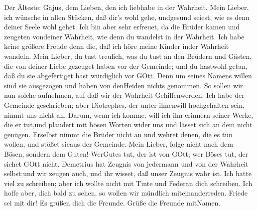  Der Älteste: Gajus, dem Lieben, den ich liebhabe in der
Wahrheit.  Mein Lieber, ich wünsche in allen Stücken, daß
dir's wohl gehe, undgesund seiest, wie es denn deiner Seele wohl gehet.
 Ich bin aber sehr erfreuet, da die Brüder kamen und
zeugeten vondeiner Wahrheit, wie denn du wandelst in der Wahrheit.
 Ich habe keine größere Freude denn die, daß ich höre meine
Kinder inder Wahrheit wandeln.  Mein Lieber, du tust
treulich, was du tust an den Brüdern und Gästen,  die von
deiner Liebe gezeuget haben vor der Gemeinde; und du hastwohl getan, daß
du sie abgefertiget hast würdiglich vor GOtt.  Denn um
seines Namens willen sind sie ausgezogen und haben von denHeiden nichts
genommen.  So sollen wir nun solche aufnehmen, auf daß wir
der Wahrheit Gehilfenwerden.  Ich habe der Gemeinde
geschrieben; aber Diotrephes, der unter ihnenwill hochgehalten sein,
nimmt uns nicht an.  Darum, wenn ich komme, will ich ihn
erinnern seiner Werke, die er tut,und plaudert mit bösen Worten wider
uns und lässet sich an dem nicht genügen. Erselbst nimmt die Brüder
nicht an und wehret denen, die es tun wollen, und stößet sieaus der
Gemeinde.  Mein Lieber, folge nicht nach dem Bösen, sondern
dem Guten! WerGutes tut, der ist von GOtt; wer Böses tut, der siehet
GOtt nicht.  Demetrius hat Zeugnis von jedermann und von
der Wahrheit selbst;und wir zeugen auch, und ihr wisset, daß unser
Zeugnis wahr ist.  Ich hatte viel zu schreiben; aber ich
wollte nicht mit Tinte und Federan dich schreiben.  Ich
hoffe aber, dich bald zu sehen, so wollen wir mündlich miteinanderreden.
 Friede sei mit dir! Es grüßen dich die Freunde. Grüße die
Freunde mitNamen.
